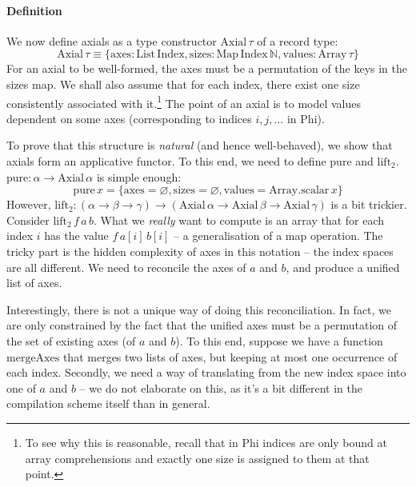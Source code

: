 \paragraph{Definition} We now define axials as a type constructor $\mathrm{Axial}\,\tau$ of a record type:
$$ \mathrm{Axial}\,\tau \equiv \{ \mathrm{axes} : \mathrm{List}\,\mathrm{Index}, \mathrm{sizes} : \mathrm{Map}\,\mathrm{Index}\,\mathbb N, \mathrm{values} : \mathrm{Array}\,\tau \} $$
For an axial to be well-formed, the axes must be a permutation of the keys in the sizes map. We shall also assume that for each index, there exist one size consistently associated with it.\footnote{To see why this is reasonable, recall that in Phi indices are only bound at array comprehensions and exactly one size is assigned to them at that point.} The point of an axial is to model values dependent on some axes (corresponding to indices $i, j, \dots$ in Phi).

To prove that this structure is \textit{natural} (and hence well-behaved), we show that axials form an applicative functor. To this end, we need to define $\mathrm{pure}$ and $\mathrm{lift}_2$. $\mathrm{pure} : \alpha \to \mathrm{Axial}\,\alpha$ is simple enough:
$$ \mathrm{pure}\,x = \{ \mathrm{axes} = \varnothing, \mathrm{sizes} = \varnothing, \mathrm{values} = \mathrm{Array.scalar}\,x \} $$
However, $\mathrm{lift}_2 : (\alpha \to \beta \to \gamma) \to (\mathrm{Axial}\,\alpha \to \mathrm{Axial}\,\beta \to \mathrm{Axial}\,\gamma)$ is a bit trickier. Consider $\mathrm{lift}_2\,f\,a\,b$. What we \textit{really} want to compute is an array that for each index $i$ has the value $f\,a[i]\,b[i]$ -- a generalisation of a map operation. The tricky part is the hidden complexity of axes in this notation -- the index spaces are all different. We need to reconcile the axes of $a$ and $b$, and produce a unified list of axes.

Interestingly, there is not a unique way of doing this reconciliation. In fact, we are only constrained by the fact that the unified axes must be a permutation of the set of existing axes (of $a$ and $b$). To this end, suppose we have a function $\mathrm{mergeAxes}$ that merges two lists of axes, but keeping at most one occurrence of each index. Secondly, we need a way of translating from the new index space into one of $a$ and $b$ -- we do not elaborate on this, as it's a bit different in the compilation scheme itself than in general. 

